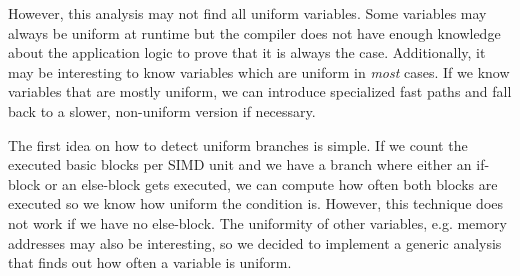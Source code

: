 However, this analysis may not find all uniform variables. Some variables may always be uniform at runtime but the compiler does not have enough knowledge about the application logic to prove that it is always the case. Additionally, it may be interesting to know variables which are uniform in \emph{most} cases. If we know variables that are mostly uniform, we can introduce specialized fast paths and fall back to a slower, non-uniform version if necessary.

The first idea on how to detect uniform branches is simple. If we count the executed basic blocks per SIMD unit and we have a branch where either an if-block or an else-block gets executed, we can compute how often both blocks are executed so we know how uniform the condition is.
However, this technique does not work if we have no else-block. The uniformity of other variables, e.g. memory addresses may also be interesting, so we decided to implement a generic analysis that finds out how often a variable is uniform.
